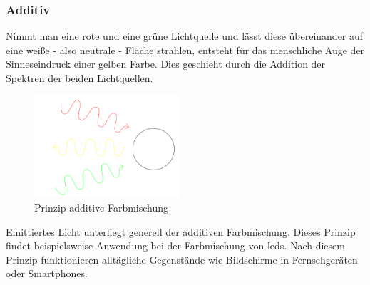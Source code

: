 \documentclass[11pt]{scrartcl}
\begin{document}
\subsubsection{Additiv}
Nimmt man eine rote und eine grüne Lichtquelle und lässt diese übereinander auf eine weiße - also neutrale - Fläche strahlen, entsteht für
das menschliche Auge der Sinneseindruck einer gelben Farbe. Dies geschieht durch die Addition der Spektren der beiden Lichtquellen.
\cite[62]{lichtquellen}\\
\begin{figure}
    \vspace{-25pt}
    \begin{center}
        \includegraphics[width=0.48\textwidth]{images/additive_color_mixing.png}
    \end{center}
    \vspace{-20pt}
    \caption{Prinzip additive Farbmischung}
    \vspace{-15pt}
\end{figure}
Emittiertes Licht unterliegt generell der additiven Farbmischung. Dieses Prinzip findet beispielsweise Anwendung bei der Farbmischung von
\ac{led}s. Nach diesem Prinzip funktionieren alltägliche Gegenstände wie Bildschirme in Fernsehgeräten oder Smartphones.
\end{document}
